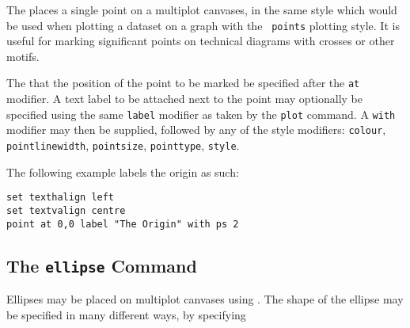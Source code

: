 The  places a single point on a multiplot canvases, in the same
style which would be used when plotting a dataset on a graph with the {\tt
points} plotting style. It is useful for marking significant points on
technical diagrams with crosses or other motifs.

The  that the position of the point to be marked be specified
after the {\tt at} modifier. A text label to be attached next to the point may
optionally be specified using the same {\tt label} modifier as taken by the
{\tt plot} command. A {\tt with} modifier may then be supplied, followed by any
of the style modifiers: {\tt colour}, {\tt pointlinewidth}, {\tt pointsize},
{\tt pointtype}, {\tt style}.

The following example labels the origin as such:
\begin{verbatim}
set texthalign left
set textvalign centre
point at 0,0 label "The Origin" with ps 2
\end{verbatim}

\subsection{The {\tt ellipse} Command}
\label{sec:ellipse}

Ellipses may be placed on multiplot canvases using . The shape
of the ellipse may be specified in many different ways, by specifying

